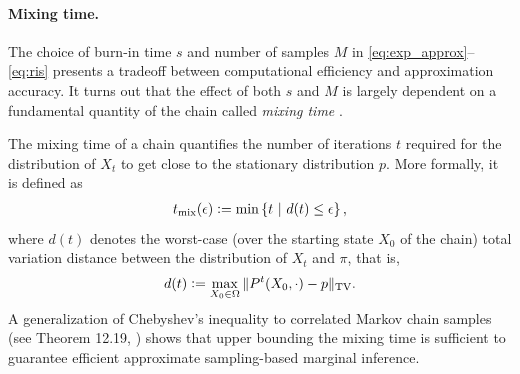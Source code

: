 \paragraph{Mixing time.}
The choice of burn-in time $s$ and number of samples $M$ in \eqref{eq:exp_approx}--\eqref{eq:ris} presents a tradeoff between computational efficiency and approximation accuracy.
It turns out that the effect of both $s$ and $M$ is largely dependent on a fundamental quantity of the chain called \emph{mixing time} \citep{levin08book}.

The mixing time of a chain quantifies the number of iterations $t$ required for the distribution of $X_t$ to get close to the stationary distribution $p$.
More formally, it is defined as
\begin{align*}
t_{\mathrm{mix}}(\epsilon) \vcentcolon= \min \left\{t\ \middle\vert\  d(t) \leq \epsilon\right\},
\end{align*}
where $d(t)$ denotes the worst-case (over the starting state $X_0$ of the chain) total variation distance between the distribution of $X_t$ and $\pi$, that is,
\begin{align*}
d(t) \vcentcolon= \max_{X_0 \in \Omega} \| P^t(X_0, \cdot) - p \|_{\mathrm{TV}}.
\end{align*}
A generalization of Chebyshev's inequality to correlated Markov chain samples (see Theorem 12.19, \citealp{levin08book}) shows that upper bounding the mixing time is sufficient to guarantee efficient approximate sampling-based marginal inference.